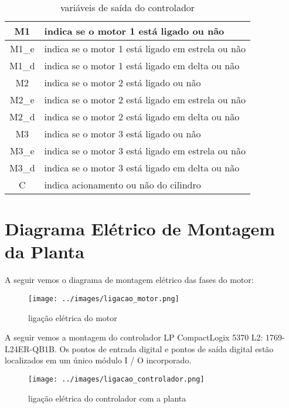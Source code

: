 \begin{table}[H]
	\centering 
	\begin{tabular}{|c|l|}\hline
	M1 & indica se o motor 1 está ligado ou não \\ \hline
	M1\_e & indica se o motor 1 está ligado  em estrela ou não \\ \hline	
	M1\_d & indica se o motor 1 está ligado  em delta ou não \\ \hline
			M2 & indica se o motor 2 está ligado ou não \\ \hline
	M2\_e & indica se o motor 2 está ligado  em estrela ou não \\ \hline	
	M2\_d & indica se o motor 2 está ligado  em delta ou não \\ \hline
		M3 & indica se o motor 3 está ligado ou não \\ \hline
	M3\_e & indica se o motor 3 está ligado  em estrela ou não \\ \hline	
	M3\_d & indica se o motor 3 está ligado  em delta ou não \\ \hline
	C & indica acionamento ou não do cilindro \\ \hline
	\end{tabular}
	\caption{variáveis de saída do controlador}
\end{table}

\section{Diagrama Elétrico de Montagem da Planta}
A seguir vemos o diagrama de montagem elétrico das fases do motor:
\begin{figure}[H]
	\centering
	\texttt{[image: ../images/ligacao\_motor.png]}
	\caption{ligação elétrica do motor}
\end{figure}

A seguir vemos a montagem do controlador LP CompactLogix 5370 L2: 1769-L24ER-QB1B.
Os pontos de entrada digital e pontos de saída digital estão localizados em um único módulo I / O incorporado.
\begin{figure}[H]
	\centering
	\texttt{[image: ../images/ligacao\_controlador.png]}
	\caption{ligação elétrica do controlador com a planta}
\end{figure}

